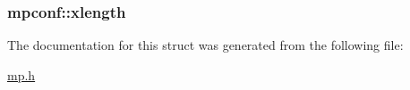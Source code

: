 \subsubsection[{\texorpdfstring{xlength}{xlength}}]{ mpconf\+::xlength}\hypertarget{structmpconf_adbda8ec5a43970662e7eab8f8da11817}{}\label{structmpconf_adbda8ec5a43970662e7eab8f8da11817}


The documentation for this struct was generated from the following file\+:\begin{DoxyCompactItemize}
\item 
\hyperlink{mp_8h}{mp.\+h}\end{DoxyCompactItemize}
